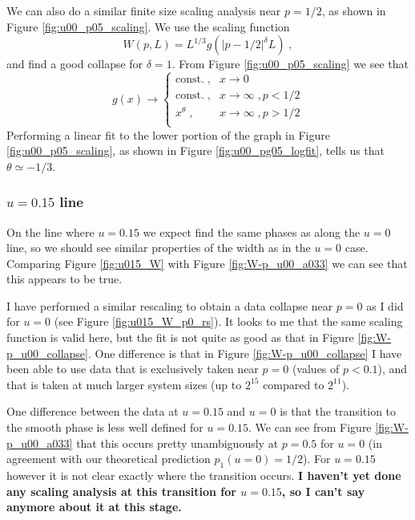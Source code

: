 \documentclass[a4paper,10pt]{article}
\newcommand{\fref}[1]{Figure \ref{#1}}
\begin{document}
We can also do a similar finite size scaling analysis near $p = 1/2$, as shown in \fref{fig:u00_p05_scaling}. We use the scaling function
\begin{equation}
 W(p,L) = L^{1/3} g(|p-1/2|^{\delta}L) \;,
\end{equation}
and find a good collapse for $\delta = 1$. From \fref{fig:u00_p05_scaling} we see that 
\begin{equation}
 g(x) \to \begin{cases}
           \mbox{const.} \;, & x \to 0 \\
           \mbox{const.} \;, & x \to \infty \;, p < 1/2 \\
           x^\theta \;, & x \to \infty \;, p > 1/2 \\
          \end{cases}
\end{equation}
Performing a linear fit to the lower portion of the graph in \fref{fig:u00_p05_scaling}, as shown in \fref{fig:u00_pg05_logfit}, tells us that $\theta \simeq -1/3$.

\subsubsection{$u = 0.15$ line}

On the line where $u = 0.15$ we expect find the same phases as along the $u = 0$ line, so we should see similar properties of the width as in the $u=0$ case. Comparing \fref{fig:u015_W} with \fref{fig:W-p_u00_a033} we can see that this appears to be true.

I have performed a similar rescaling to obtain a data collapse near $p=0$ as I did for $u=0$ (see \fref{fig:u015_W_p0_rs}). It looks to me that the same scaling function is valid here, but the fit is not quite as good as that in \fref{fig:W-p_u00_collapse}. One difference is that in \fref{fig:W-p_u00_collapse} I have been able to use data that is exclusively taken near $p = 0$ (values of $p < 0.1$), and that is taken at much larger system sizes (up to $2^{15}$ compared to $2^{11}$).
\newline

One difference between the data at $u=0.15$ and $u=0$ is that the transition to the smooth phase is less well defined for $u=0.15$. We can see from \fref{fig:W-p_u00_a033} that this occurs pretty unambiguously at $p=0.5$ for $u=0$ (in agreement with our theoretical prediction $p_1(u=0) = 1/2$). For $u=0.15$ however it is not clear exactly where the transition occurs. {\bf I haven't yet done any scaling analysis at this transition for $u=0.15$, so I can't say anymore about it at this stage.}
\end{document}
